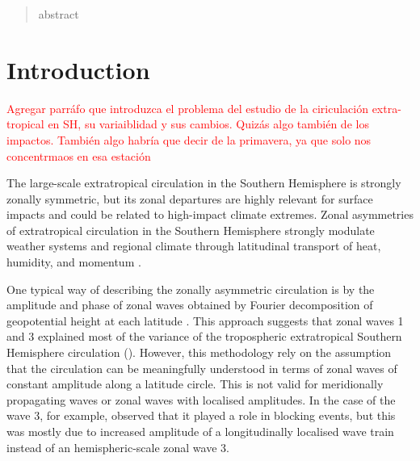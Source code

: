 \documentclass[smallextended]{svjour3}       %
\begin{document}
\date{Received: date / Accepted: date}


\maketitle

\begin{abstract}
abstract
\\
\keywords{
         \and
    }


\end{abstract}


\def\spacingset#1{\renewcommand{\baselinestretch}%
{#1}\small\normalsize} \spacingset{1}


\hypertarget{introduction}{%
\section{Introduction}\label{introduction}}

\textcolor{red}{Agregar parráfo que introduzca el problema del estudio de la ciriculación extra-tropical en SH, su variaiblidad y sus cambios. Quizás algo también de los impactos. También algo habría que decir de la primavera, ya que solo nos concentrmaos en esa estación}

The large-scale extratropical circulation in the Southern Hemisphere is strongly zonally symmetric, but its zonal departures are highly relevant for surface impacts and could be related to high-impact climate extremes.
Zonal asymmetries of extratropical circulation in the Southern Hemisphere strongly modulate weather systems and regional climate through latitudinal transport of heat, humidity, and momentum \citep{trenberth1980}.

One typical way of describing the zonally asymmetric circulation is by the amplitude and phase of zonal waves obtained by Fourier decomposition of geopotential height at each latitude \citep[e.g.][]{vanloon1972, trenberth1980, turner2017}.
This approach suggests that zonal waves 1 and 3 explained most of the variance of the tropospheric extratropical Southern Hemisphere circulation (\citet{vanloon1972}).
However, this methodology rely on the assumption that the circulation can be meaningfully understood in terms of zonal waves of constant amplitude along a latitude circle.
This is not valid for meridionally propagating waves or zonal waves with localised amplitudes.
In the case of the wave 3, for example, \citet{trenberth1985} observed that it played a role in blocking events, but this was mostly due to increased amplitude of a longitudinally localised wave train instead of an hemispheric-scale zonal wave 3.
\end{document}
